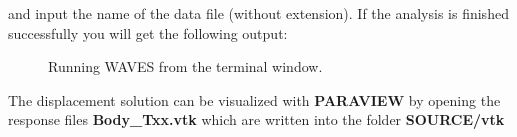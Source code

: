 \documentclass[12pt,letterpaper]{article}
\begin{document}
and input the name of the data file (without extension). If the analysis is finished successfully you will get the following output:

\begin{figure}[H]
\centering
{}
\caption{Running WAVES from the terminal window.}
\label{fig: terminal}
\end{figure} 
 
The displacement solution can be visualized with {\bf PARAVIEW} by opening the response files {\bf Body\_Txx.vtk} which are written into the folder {\bf SOURCE/vtk}




{}


 
\end{document}

